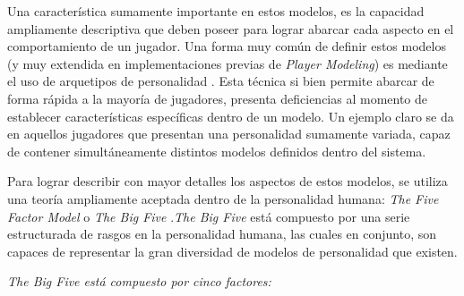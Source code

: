 \documentclass[conference]{IEEEtran}
\begin{document}
Una característica sumamente importante en estos modelos, es la capacidad ampliamente descriptiva que deben poseer para lograr abarcar cada aspecto en el comportamiento de un jugador. Una forma muy común de definir estos modelos (y muy extendida en implementaciones previas de \textit{Player Modeling}) es mediante el uso de arquetipos de personalidad \citep{tuunanen2012meta}. Esta técnica si bien permite abarcar de forma rápida a la mayoría de jugadores, presenta deficiencias al momento de establecer características específicas dentro de un modelo. Un ejemplo claro se da en aquellos jugadores que presentan una personalidad sumamente variada, capaz de contener simultáneamente distintos modelos definidos dentro del sistema.

Para lograr describir con mayor detalles los aspectos de estos modelos, se utiliza una teoría ampliamente aceptada dentro de la personalidad humana: \textit{The Five Factor Model} o  \textit{The Big Five} \citep{goldberg1990alternative}.\textit{The Big Five} está compuesto por una serie estructurada de rasgos en la personalidad humana, las cuales en conjunto, son capaces de representar la gran diversidad de modelos de personalidad que existen. 

\textit{The Big Five está compuesto por cinco factores:}
\end{document}
